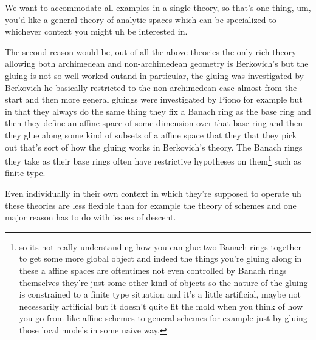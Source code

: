 \begin{answer}
    
        We want to accommodate all examples in a single theory, so that's one thing, um, you'd like a general theory of analytic spaces which can be specialized to whichever context you might uh be interested in.

        
        The second reason would be, out of all the above theories the only rich theory allowing both archimedean and non-archimedean geometry is Berkovich's but the gluing is not so well worked outand in particular, the gluing was investigated by Berkovich he basically restricted to the non-archimedean case almost from the start and then more general gluings were investigated by Piono \citeme{} for example but in that they always do the same thing they fix a Banach ring as the base ring and then they define an affine space of some dimension over that base ring and then they glue along some kind of subsets of a affine space that they that they pick out that's sort of how the gluing works in Berkovich's theory. The Banach rings they take as their base rings often have restrictive hypotheses on them\footnote{so its not really understanding how you can glue two Banach rings together to get some more global object and indeed the things you're gluing along in these a affine spaces are oftentimes not even controlled by Banach rings themselves they're just some other kind of objects so the nature of the gluing is constrained to a finite type situation and it's a little artificial, maybe not necessarily artificial but it doesn't quite fit the mold when you think of how you go from like affine schemes to general schemes for example just by gluing those local models in some naive way.} such as finite type.

        
         Even individually in their own context in which they're supposed to operate uh these theories are less flexible than for example the theory of schemes and one major reason has to do with issues of descent.

\end{answer}

